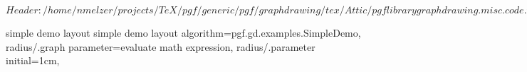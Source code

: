 %
%
%

\ProvidesFileRCS[v\pgfversion] $Header: /home/nmelzer/projects/TeX/pgf/generic/pgf/graphdrawing/tex/Attic/pgflibrarygraphdrawing.misc.code.tex,v 1.2 2012/04/19 13:49:07 tantau Exp $



%
%
\pgfgddeclarealgorithmkey
  {simple demo layout}
  {simple demo layout}
  {
    algorithm=pgf.gd.examples.SimpleDemo,
    radius/.graph parameter=evaluate math expression,
    radius/.parameter initial=1cm,
  }



\endinput